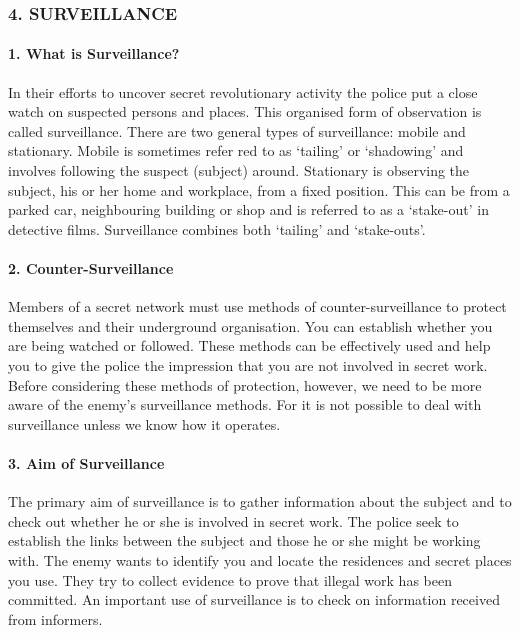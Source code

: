 \subsubsection{4. SURVEILLANCE}

\paragraph{1. What is Surveillance?}

In their efforts to uncover secret revolutionary activity the police put
a close watch on suspected persons and places. This organised form of
observation is called surveillance. There are two general types of
surveillance: mobile and stationary. Mobile is sometimes refer red to as
`tailing' or `shadowing' and involves following the suspect (subject)
around. Stationary is observing the subject, his or her home and
workplace, from a fixed position. This can be from a parked car,
neighbouring building or shop and is referred to as a `stake-out' in
detective films. Surveillance combines both `tailing' and `stake-outs'.

\paragraph{2. Counter-Surveillance}

Members of a secret network must use methods of counter-surveillance to
protect themselves and their underground organisation. You can establish
whether you are being watched or followed. These methods can be
effectively used and help you to give the police the impression that you
are not involved in secret work. Before considering these methods of
protection, however, we need to be more aware of the enemy's
surveillance methods. For it is not possible to deal with surveillance
unless we know how it operates.

\paragraph{3. Aim of Surveillance}

The primary aim of surveillance is to gather information about the
subject and to check out whether he or she is involved in secret work.
The police seek to establish the links between the subject and those he
or she might be working with. The enemy wants to identify you and locate
the residences and secret places you use. They try to collect evidence
to prove that illegal work has been committed. An important use of
surveillance is to check on information received from informers.

